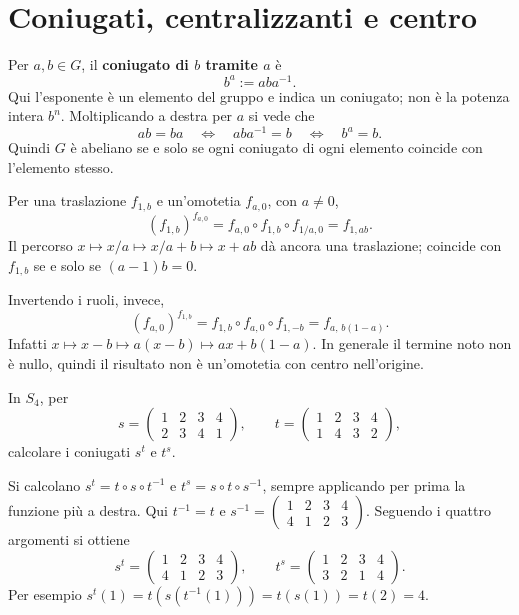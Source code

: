 \section{Coniugati, centralizzanti e centro}
\begin{definizione}
Per $a,b\in G$, il \textbf{coniugato di $b$ tramite $a$} è
\[
b^a:=aba^{-1}.
\]
Qui l'esponente è un elemento del gruppo e indica un coniugato; non è la potenza intera $b^n$. Moltiplicando a destra per $a$ si vede che
\[
ab=ba\quad\Longleftrightarrow\quad aba^{-1}=b\quad\Longleftrightarrow\quad b^a=b.
\]
Quindi $G$ è abeliano se e solo se ogni coniugato di ogni elemento coincide con l'elemento stesso.
\end{definizione}

\begin{esempio}
Per una traslazione $f_{1,b}$ e un'omotetia $f_{a,0}$, con $a\ne0$,
\[
(f_{1,b})^{f_{a,0}}=f_{a,0}\circ f_{1,b}\circ f_{1/a,0}=f_{1,ab}.
\]
Il percorso $x\mapsto x/a\mapsto x/a+b\mapsto x+ab$ dà ancora una traslazione; coincide con $f_{1,b}$ se e solo se $(a-1)b=0$.

Invertendo i ruoli, invece,
\[
(f_{a,0})^{f_{1,b}}=f_{1,b}\circ f_{a,0}\circ f_{1,-b}=f_{a,\,b(1-a)}.
\]
Infatti $x\mapsto x-b\mapsto a(x-b)\mapsto ax+b(1-a)$. In generale il termine noto non è nullo, quindi il risultato non è un'omotetia con centro nell'origine.
\end{esempio}

\begin{esercizio}
In $S_4$, per
\[
s=\begin{pmatrix}1&2&3&4\\2&3&4&1\end{pmatrix},\qquad
t=\begin{pmatrix}1&2&3&4\\1&4&3&2\end{pmatrix},
\]
calcolare i coniugati $s^t$ e $t^s$.
\end{esercizio}
\begin{svolgimento}
Si calcolano $s^t=t\circ s\circ t^{-1}$ e $t^s=s\circ t\circ s^{-1}$, sempre applicando per prima la funzione più a destra. Qui $t^{-1}=t$ e $s^{-1}=\left(\begin{smallmatrix}1&2&3&4\\4&1&2&3\end{smallmatrix}\right)$. Seguendo i quattro argomenti si ottiene
\[
s^t=\begin{pmatrix}1&2&3&4\\4&1&2&3\end{pmatrix},\qquad
t^s=\begin{pmatrix}1&2&3&4\\3&2&1&4\end{pmatrix}.
\]
Per esempio $s^t(1)=t(s(t^{-1}(1)))=t(s(1))=t(2)=4$.
\end{svolgimento}

